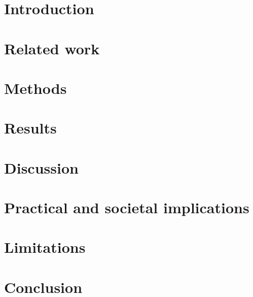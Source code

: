 \documentclass[pdflatex,sn-basic,iicol]{sn-jnl}
\theoremstyle{thmstyleone}
\theoremstyle{thmstyletwo}
\theoremstyle{thmstylethree}
\begin{document}

\maketitle

\section{Introduction}\label{sec:intro}


\section{Related work}\label{sec:related}


\section{Methods}\label{sec:methods}


\section{Results}\label{sec:results}


\section{Discussion}\label{sec:discussion}


\section{Practical and societal implications}\label{sec:implications}


\section{Limitations}\label{sec:limitations}


\section{Conclusion}\label{sec:conclusion}


\backmatter
\end{document}
